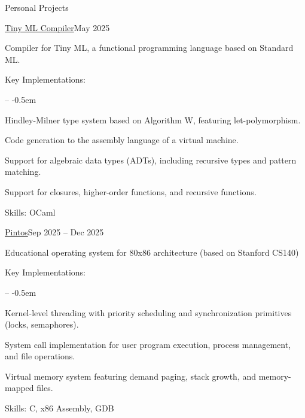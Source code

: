 \documentclass{resume}
\begin{document}
\begin{rSection}{Personal Projects}
	\begin{rSubsection}{\href{https://github.com/kimminss0/tml-compiler} {Tiny ML Compiler}}{May 2025}

		Compiler for Tiny ML, a functional programming language based on Standard ML.

		\item Key Implementations:
		\vspace{-0.5em}
		\begin{list}{--}{}
			\itemsep -0.5em
			\item Hindley-Milner type system based on Algorithm W, featuring let-polymorphism.
			\item Code generation to the assembly language of a virtual machine.
			\item Support for algebraic data types (ADTs), including recursive types and pattern matching.
			\item Support for closures, higher-order functions, and recursive functions.
		\end{list}
		\item Skills: OCaml
	\end{rSubsection}

	\begin{rSubsection}{\href{https://github.com/kimminss0/CSED312} {Pintos}}{Sep 2025 -- Dec 2025}

		Educational operating system for 80x86 architecture (based on Stanford CS140)

		\item Key Implementations:
		\vspace{-0.5em}
		\begin{list}{--}{}
			\itemsep -0.5em

			\item Kernel-level threading with priority scheduling and synchronization primitives (locks, semaphores).

			\item System call implementation for user program execution, process management, and file operations.

			\item Virtual memory system featuring demand paging, stack growth, and memory-mapped files.
		\end{list}

		\item Skills: C, x86 Assembly, GDB

	\end{rSubsection}


\end{rSection}
\end{document}
